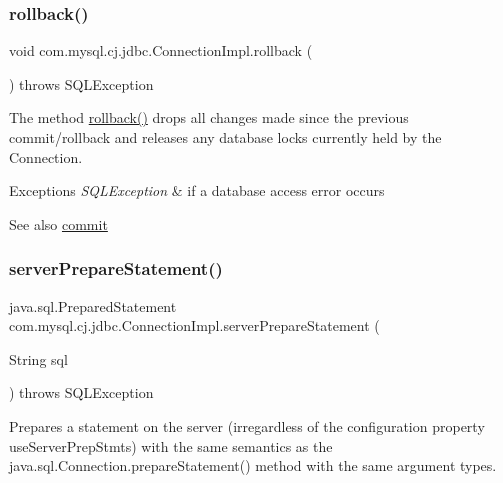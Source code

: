 \subsubsection{\texorpdfstring{rollback()}{rollback()}}
{\footnotesize\ttfamily void com.\+mysql.\+cj.\+jdbc.\+Connection\+Impl.\+rollback (\begin{DoxyParamCaption}{ }\end{DoxyParamCaption}) throws S\+Q\+L\+Exception}

The method \mbox{\hyperlink{classcom_1_1mysql_1_1cj_1_1jdbc_1_1_connection_impl_adb29692483164e8c98dbeb9c6eb5a972}{rollback()}} drops all changes made since the previous commit/rollback and releases any database locks currently held by the Connection.


\begin{DoxyExceptions}{Exceptions}
{\em S\+Q\+L\+Exception} & if a database access error occurs \\
\hline
\end{DoxyExceptions}
\begin{DoxySeeAlso}{See also}
\mbox{\hyperlink{classcom_1_1mysql_1_1cj_1_1jdbc_1_1_connection_impl_ac6218bc1a284e67ff9557bdefc52c388}{commit}} 
\end{DoxySeeAlso}
\mbox{\label{classcom_1_1mysql_1_1cj_1_1jdbc_1_1_connection_impl_ad91b5892ca4cc22ca40b2421171b0078}} 
\subsubsection{\texorpdfstring{server\+Prepare\+Statement()}{serverPrepareStatement()}\hspace{0.1cm}{\footnotesize\ttfamily [1/6]}}
{\footnotesize\ttfamily java.\+sql.\+Prepared\+Statement com.\+mysql.\+cj.\+jdbc.\+Connection\+Impl.\+server\+Prepare\+Statement (\begin{DoxyParamCaption}\item[{String}]{sql }\end{DoxyParamCaption}) throws S\+Q\+L\+Exception}

Prepares a statement on the server (irregardless of the configuration property \textquotesingle{}use\+Server\+Prep\+Stmts\textquotesingle{}) with the same semantics as the java.\+sql.\+Connection.\+prepare\+Statement() method with the same argument types.


